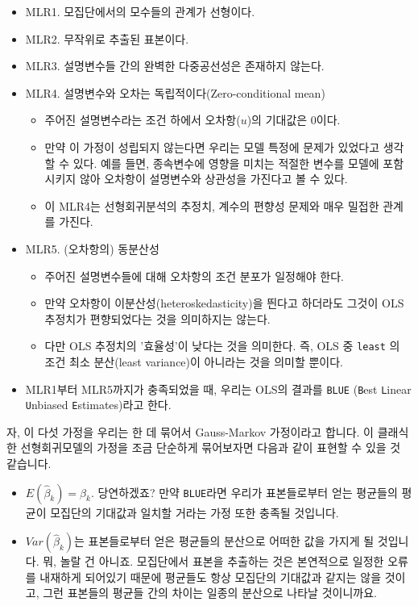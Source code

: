 \documentclass[
]{book}
\begin{document}
\begin{itemize}
\item
  MLR1. 모집단에서의 모수들의 관계가 선형이다.
\item
  MLR2. 무작위로 추출된 표본이다.
\item
  MLR3. 설명변수들 간의 완벽한 다중공선성은 존재하지 않는다.
\item
  MLR4. 설명변수와 오차는 독립적이다(Zero-conditional mean)

  \begin{itemize}
  \item
    주어진 설명변수라는 조건 하에서 오차항(\(u\))의 기대값은 0이다.
  \item
    만약 이 가정이 성립되지 않는다면 우리는 모델 특정에 문제가 있었다고 생각할 수 있다. 예를 들면, 종속변수에 영향을 미치는 적절한 변수를 모델에 포함시키지 않아 오차항이 설명변수와 상관성을 가진다고 볼 수 있다.
  \item
    이 MLR4는 선형회귀분석의 추정치, 계수의 편향성 문제와 매우 밀접한 관계를 가진다.
  \end{itemize}
\item
  MLR5. (오차항의) 동분산성

  \begin{itemize}
  \item
    주어진 설명변수들에 대해 오차항의 조건 분포가 일정해야 한다.
  \item
    만약 오차항이 이분산성(heteroskedasticity)을 띈다고 하더라도 그것이 OLS 추정치가 편향되었다는 것을 의미하지는 않는다.
  \item
    다만 OLS 추정치의 '효율성'이 낮다는 것을 의미한다. 즉, OLS 중 \texttt{least} 의 조건 최소 분산(least variance)이 아니라는 것을 의미할 뿐이다.
  \end{itemize}
\item
  MLR1부터 MLR5까지가 충족되었을 때, 우리는 OLS의 결과를 \texttt{BLUE} (\texttt{B}est \texttt{L}inear \texttt{U}nbiased \texttt{E}stimates)라고 한다.
\end{itemize}

자, 이 다섯 가정을 우리는 한 데 묶어서 Gauss-Markov 가정이라고 합니다. 이 클래식한 선형회귀모델의 가정을 조금 단순하게 묶어보자면 다음과 같이 표현할 수 있을 것 같습니다.

\begin{itemize}
\item
  \(E(\hat{\beta}_k) = \beta_k\). 당연하겠죠? 만약 \texttt{BLUE}라면 우리가 표본들로부터 얻는 평균들의 평균이 모집단의 기대값과 일치할 거라는 가정 또한 충족될 것입니다.
\item
  \(Var(\hat{\beta}_k)\)는 표본들로부터 얻은 평균들의 분산으로 어떠한 값을 가지게 될 것입니다. 뭐, 놀랄 건 아니죠. 모집단에서 표본을 추출하는 것은 본연적으로 일정한 오류를 내재하게 되어있기 때문에 평균들도 항상 모집단의 기대값과 같지는 않을 것이고, 그런 표본들의 평균들 간의 차이는 일종의 분산으로 나타날 것이니까요.
\end{itemize}
\end{document}
